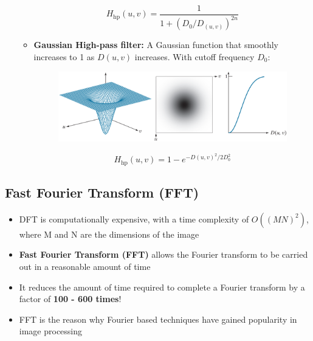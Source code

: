 \begin{itemize}
\begin{itemize}
        \begin{equation*}
          H_\text{hp}(u, v) = \frac{1}{1 + (D_0/D_(u, v))^{2n}}
        \end{equation*}

      \item \textbf{Gaussian High-pass filter:} A Gaussian function
        that smoothly increases to 1 as $D(u, v)$ increases. With cutoff
        frequency $D_0$:

        \begin{minipage}{\linewidth}
          \begin{figure}[H]
            \centering
            \includegraphics[width=\linewidth]{images/gaussian_high_pass.png}
          \end{figure}
        \end{minipage}

        \begin{equation*}
          H_\text{hp}(u, v) = 1 - e^{-D(u, v)^2/2D_0^2}
        \end{equation*}

    \end{itemize}
\end{itemize}

\subsection*{Fast Fourier Transform (FFT)}

\begin{itemize}
  \item DFT is computationally expensive, with a time complexity of $O((MN)^2)$, where M and N are the dimensions of the image
  \item \textbf{Fast Fourier Transform (FFT)} allows the Fourier transform to be carried out in a reasonable amount of time
  \item It reduces the amount of time required to complete a Fourier transform by a factor of \textbf{100 - 600 times}!
  \item FFT is the reason why Fourier based techniques have gained popularity in image processing
\end{itemize}
  
